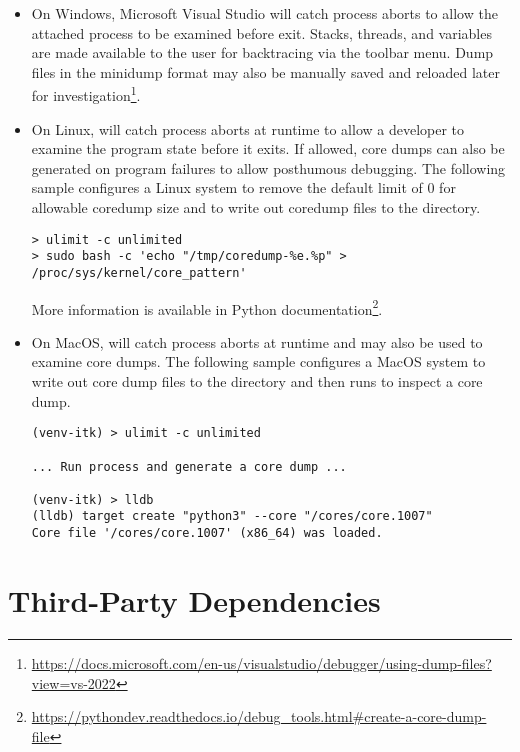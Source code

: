 \begin{itemize}

\item On Windows, Microsoft Visual Studio will catch process aborts
to allow the attached process to be examined before exit. Stacks, threads,
and variables are made available to the user for backtracing via the
 toolbar menu. Dump files in the minidump format may also
be manually saved and reloaded later for investigation\footnote{
\url{https://docs.microsoft.com/en-us/visualstudio/debugger/using-dump-files?view=vs-2022}}.

\item On Linux,  will catch process aborts at runtime to allow
a developer to examine the program state before it exits.
If allowed, core dumps can also be generated on program failures
to allow posthumous debugging. The following sample
configures a Linux system to remove the default limit of 0 for allowable
coredump size and to write out coredump files to the  directory.

\begin{verbatim}
> ulimit -c unlimited
> sudo bash -c 'echo "/tmp/coredump-%e.%p" > /proc/sys/kernel/core_pattern'
\end{verbatim}

More information is available in Python documentation\footnote{
\url{https://pythondev.readthedocs.io/debug_tools.html\#create-a-core-dump-file}}.

\item On MacOS,  will catch process aborts at runtime
and may also be used to examine core dumps. The following sample
configures a MacOS system to write out core dump files to the 
directory and then runs  to inspect a core dump.

\begin{verbatim}
(venv-itk) > ulimit -c unlimited

... Run process and generate a core dump ...

(venv-itk) > lldb
(lldb) target create "python3" --core "/cores/core.1007"
Core file '/cores/core.1007' (x86_64) was loaded.
\end{verbatim}

\end{itemize}


\section{Third-Party Dependencies}
\label{sec:ThirdParty}

